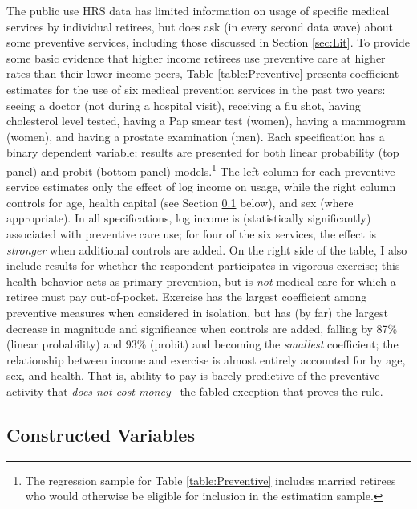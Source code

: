 \documentclass[12pt,pdftex,letterpaper]{article}
\begin{document}
The public use HRS data has limited information on usage of specific medical services by individual retirees, but does ask (in every second data wave) about some preventive services, including those discussed in Section \ref{sec:Lit}.  To provide some basic evidence that higher income retirees use preventive care at higher rates than their lower income peers, Table \ref{table:Preventive} presents coefficient estimates for the use of six medical prevention services in the past two years: seeing a doctor (not during a hospital visit), receiving a flu shot, having cholesterol level tested, having a Pap smear test (women), having a mammogram (women), and having a prostate examination (men). Each specification has a binary dependent variable; results are presented for both linear probability (top panel) and probit (bottom panel) models.\footnote{The regression sample for Table \ref{table:Preventive} includes married retirees who would otherwise be eligible for inclusion in the estimation sample.}  The left column for each preventive service estimates only the effect of log income on usage, while the right column controls for age, health capital (see Section \ref{sec:Constructions} below), and sex (where appropriate).  In all specifications, log income is (statistically significantly) associated with preventive care use; for four of the six services, the effect is \textit{stronger} when additional controls are added.  On the right side of the table, I also include results for whether the respondent participates in vigorous exercise; this health behavior acts as primary prevention, but is \textit{not} medical care for which a retiree must pay out-of-pocket.  Exercise has the largest coefficient among preventive measures when considered in isolation, but has (by far) the largest decrease in magnitude and significance when controls are added, falling by 87\% (linear probability) and 93\% (probit) and becoming the \textit{smallest} coefficient; the relationship between income and exercise is almost entirely accounted for by age, sex, and health. That is, ability to pay is barely predictive of the preventive activity that \textit{does not cost money}-- the fabled exception that proves the rule.


\subsection{Constructed Variables}
\label{sec:Constructions}
\end{document}
